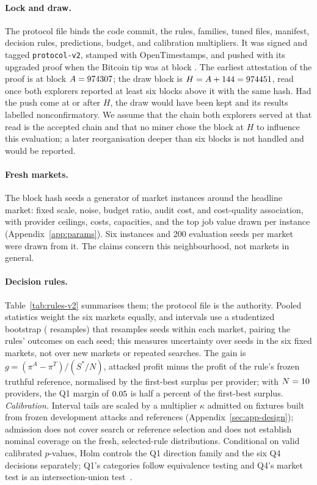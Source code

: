 \documentclass[11pt]{article}
\begin{document}
\paragraph{Lock and draw.} The protocol file binds the code commit, the rules, families, tuned files, manifest, decision rules, predictions, budget, and calibration multipliers. It was signed and tagged \texttt{protocol-v2}, stamped with OpenTimestamps, and pushed with its upgraded proof when the Bitcoin tip was at block . The earliest attestation of the proof is at block $A = 974307$; the draw block is $H = A + 144 = 974451$, read once both explorers reported at least six blocks above it with the same hash. Had the push come at or after $H$, the draw would have been kept and its results labelled nonconfirmatory. We assume that the chain both explorers served at that read is the accepted chain and that no miner chose the block at $H$ to influence this evaluation; a later reorganisation deeper than six blocks is not handled and would be reported.

\paragraph{Fresh markets.} The block hash seeds a generator of market instances around the headline market: fixed scale, noise, budget ratio, audit cost, and cost-quality association, with provider ceilings, costs, capacities, and the top job value drawn per instance (Appendix~\ref{app:params}). Six instances and 200 evaluation seeds per market were drawn from it. The claims concern this neighbourhood, not markets in general.

\paragraph{Decision rules.} Table~\ref{tab:rules-v2} summarises them; the protocol file is the authority. Pooled statistics weight the six markets equally, and intervals use a studentized bootstrap ( resamples) that resamples seeds within each market, pairing the rules' outcomes on each seed; this measures uncertainty over seeds in the six fixed markets, not over new markets or repeated searches. The gain is $g = (\pi^{A} - \pi^{T})/(S^*/N)$, attacked profit minus the profit of the rule's frozen truthful reference, normalised by the first-best surplus per provider; with $N = 10$ providers, the Q1 margin of $0.05$ is half a percent of the first-best surplus. \emph{Calibration.} Interval tails are scaled by a multiplier $\kappa$ admitted on fixtures built from frozen development attacks and references (Appendix~\ref{sec:app-design}); admission does not cover search or reference selection and does not establish nominal coverage on the fresh, selected-rule distributions. Conditional on valid calibrated $p$-values, Holm controls the Q1 direction family and the six Q4 decisions separately; Q1's categories follow equivalence testing and Q4's market test is an intersection-union test~\cite{berger1996bioequivalence}.
\end{document}
